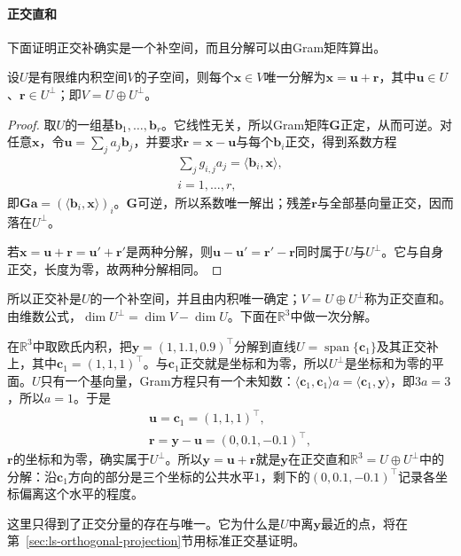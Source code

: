 \paragraph{正交直和}
下面证明正交补确实是一个补空间，而且分解可以由Gram矩阵算出。
\begin{lemma}[正交直和]
\label{lem:ls-orthogonal-decomposition}
设$U$是有限维内积空间$V$的子空间，则每个$\bm x\in V$唯一分解为$\bm x=\bm u+\bm r$，其中$\bm u\in U$、$\bm r\in U^\perp$；即$V=U\oplus U^\perp$。
\end{lemma}
\begin{proof}
取$U$的一组基$\bm b_1,\ldots,\bm b_r$。它线性无关，所以Gram矩阵$\bm G$正定，从而可逆。对任意$\bm x$，令$\bm u=\sum_j a_j\bm b_j$，并要求$\bm r=\bm x-\bm u$与每个$\bm b_i$正交，得到系数方程
\[
 \begin{gathered}
\sum_j g_{i,j}a_j=\langle\bm b_i,\bm x\rangle,\\
i=1,\ldots,r,
 \end{gathered}
\]
即$\bm G\bm a=(\langle\bm b_i,\bm x\rangle)_i$。$\bm G$可逆，所以系数唯一解出；残差$\bm r$与全部基向量正交，因而落在$U^\perp$。

若$\bm x=\bm u+\bm r=\bm u'+\bm r'$是两种分解，则$\bm u-\bm u'=\bm r'-\bm r$同时属于$U$与$U^\perp$。它与自身正交，长度为零，故两种分解相同。
\end{proof}
所以正交补是$U$的一个补空间，并且由内积唯一确定；$V=U\oplus U^\perp$称为正交直和。由维数公式，$\dim U^\perp=\dim V-\dim U$。下面在$\mathbb R^3$中做一次分解。
\begin{example}[向一条直线的正交分解]
\label{ex:ls-orthogonal-decomposition-line}
在$\mathbb R^3$中取欧氏内积，把$\bm y=(1,1.1,0.9)^\top$分解到直线$U=\operatorname{span}\{\bm c_1\}$及其正交补上，其中$\bm c_1=(1,1,1)^\top$。与$\bm c_1$正交就是坐标和为零，所以$U^\perp$是坐标和为零的平面。$U$只有一个基向量，Gram方程只有一个未知数：$\langle\bm c_1,\bm c_1\rangle a=\langle\bm c_1,\bm y\rangle$，即$3a=3$，所以$a=1$。于是
\[
 \begin{gathered}
 \bm u=\bm c_1=(1,1,1)^\top,
 \\
 \bm r=\bm y-\bm u=(0,0.1,-0.1)^\top,
 \end{gathered}
\]
$\bm r$的坐标和为零，确实属于$U^\perp$。所以$\bm y=\bm u+\bm r$就是$\bm y$在正交直和$\mathbb R^3=U\oplus U^\perp$中的分解：沿$\bm c_1$方向的部分是三个坐标的公共水平$1$，剩下的$(0,0.1,-0.1)^\top$记录各坐标偏离这个水平的程度。
\end{example}
这里只得到了正交分量的存在与唯一。它为什么是$U$中离$\bm y$最近的点，将在第~\ref{sec:ls-orthogonal-projection}节用标准正交基证明。

